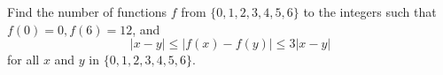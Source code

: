 Find the number of functions $f$ from $\{0,1,2,3,4,5,6\}$ to the integers such that $f(0)=0, f(6)=12$,  and\[|x-y| \le |f(x)-f(y)| \le 3 |x-y| \]for all $x$ and $y$ in $\{0,1,2,3,4,5,6\}$.